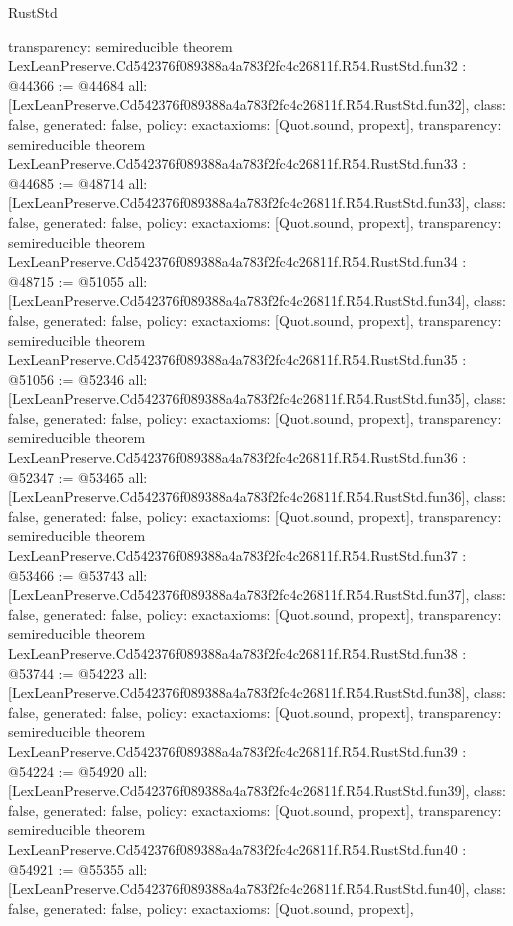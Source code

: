 \begin{lexlean}{RustStd}
\begin{coremodule}
{  transparency: semireducible
}
theorem LexLeanPreserve.Cd542376f089388a4a783f2fc4c26811f.R54.RustStd.fun32 : @44366 := @44684 {
  all: [LexLeanPreserve.Cd542376f089388a4a783f2fc4c26811f.R54.RustStd.fun32],
  class: false,
  generated: false,
  policy: exact{axioms: [Quot.sound, propext]},
  transparency: semireducible
}
theorem LexLeanPreserve.Cd542376f089388a4a783f2fc4c26811f.R54.RustStd.fun33 : @44685 := @48714 {
  all: [LexLeanPreserve.Cd542376f089388a4a783f2fc4c26811f.R54.RustStd.fun33],
  class: false,
  generated: false,
  policy: exact{axioms: [Quot.sound, propext]},
  transparency: semireducible
}
theorem LexLeanPreserve.Cd542376f089388a4a783f2fc4c26811f.R54.RustStd.fun34 : @48715 := @51055 {
  all: [LexLeanPreserve.Cd542376f089388a4a783f2fc4c26811f.R54.RustStd.fun34],
  class: false,
  generated: false,
  policy: exact{axioms: [Quot.sound, propext]},
  transparency: semireducible
}
theorem LexLeanPreserve.Cd542376f089388a4a783f2fc4c26811f.R54.RustStd.fun35 : @51056 := @52346 {
  all: [LexLeanPreserve.Cd542376f089388a4a783f2fc4c26811f.R54.RustStd.fun35],
  class: false,
  generated: false,
  policy: exact{axioms: [Quot.sound, propext]},
  transparency: semireducible
}
theorem LexLeanPreserve.Cd542376f089388a4a783f2fc4c26811f.R54.RustStd.fun36 : @52347 := @53465 {
  all: [LexLeanPreserve.Cd542376f089388a4a783f2fc4c26811f.R54.RustStd.fun36],
  class: false,
  generated: false,
  policy: exact{axioms: [Quot.sound, propext]},
  transparency: semireducible
}
theorem LexLeanPreserve.Cd542376f089388a4a783f2fc4c26811f.R54.RustStd.fun37 : @53466 := @53743 {
  all: [LexLeanPreserve.Cd542376f089388a4a783f2fc4c26811f.R54.RustStd.fun37],
  class: false,
  generated: false,
  policy: exact{axioms: [Quot.sound, propext]},
  transparency: semireducible
}
theorem LexLeanPreserve.Cd542376f089388a4a783f2fc4c26811f.R54.RustStd.fun38 : @53744 := @54223 {
  all: [LexLeanPreserve.Cd542376f089388a4a783f2fc4c26811f.R54.RustStd.fun38],
  class: false,
  generated: false,
  policy: exact{axioms: [Quot.sound, propext]},
  transparency: semireducible
}
theorem LexLeanPreserve.Cd542376f089388a4a783f2fc4c26811f.R54.RustStd.fun39 : @54224 := @54920 {
  all: [LexLeanPreserve.Cd542376f089388a4a783f2fc4c26811f.R54.RustStd.fun39],
  class: false,
  generated: false,
  policy: exact{axioms: [Quot.sound, propext]},
  transparency: semireducible
}
theorem LexLeanPreserve.Cd542376f089388a4a783f2fc4c26811f.R54.RustStd.fun40 : @54921 := @55355 {
  all: [LexLeanPreserve.Cd542376f089388a4a783f2fc4c26811f.R54.RustStd.fun40],
  class: false,
  generated: false,
  policy: exact{axioms: [Quot.sound, propext]},
}
\end{coremodule}
\end{lexlean}

